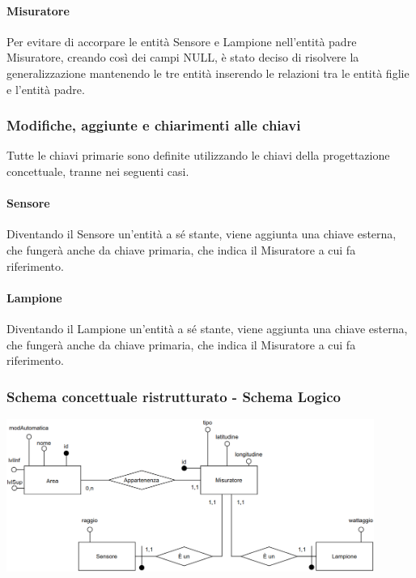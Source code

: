 \paragraph{Misuratore}

Per evitare di accorpare le entità Sensore e Lampione nell'entità padre Misuratore, creando così dei campi NULL, è stato deciso di risolvere la generalizzazione mantenendo le tre entità inserendo le relazioni tra le entità figlie e l'entità padre.

\subsubsection{Modifiche, aggiunte e chiarimenti alle chiavi}

Tutte le chiavi primarie sono definite utilizzando le chiavi della progettazione concettuale, tranne nei seguenti casi.

\paragraph{Sensore} Diventando il Sensore un'entità a sé stante, viene aggiunta una chiave esterna, che fungerà anche da chiave primaria, che indica il Misuratore a cui fa riferimento.

\paragraph{Lampione} Diventando il Lampione un'entità a sé stante, viene aggiunta una chiave esterna, che fungerà anche da chiave primaria, che indica il Misuratore a cui fa riferimento.

\subsubsection{Schema concettuale ristrutturato - Schema Logico}

\begin{center}
    \includegraphics[width=12cm]{contenuti/specifica-basi-dati/img-sbd/anagrafica_logico.png}
\end{center}

